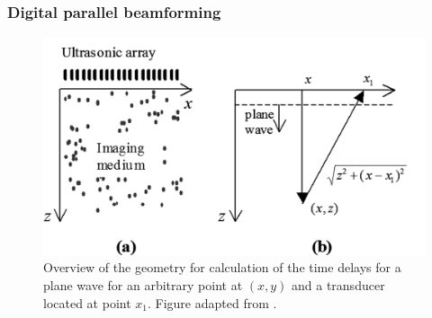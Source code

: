 \subsubsection{Digital parallel beamforming}

\begin{figure}[!b]
    \centering
    \includegraphics[width=.5\linewidth]{Figures/Ultrasound/beamforming_geo.pdf}
    \caption{Overview of the geometry for calculation of the time delays for a plane wave for an arbitrary point at $(x,y)$ and a transducer located at point $x_1$. Figure adapted from \citet{montaldo_coherent_2009}.}
    \label{fig:us_beamforming_geo}
\end{figure}

